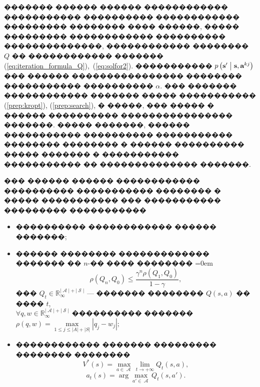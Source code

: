 \documentclass[11pt]{ubs}
\DeclareMathOperator{\state}{\mathcal{S}}
\DeclareMathOperator{\action}{\mathcal{A}}
\begin{document}
������� ������ ������  ������������ ����������� ���������� ������������ ��������� �������� ���� ������, ����� ��������� ������������ ���������� ��������������, ������������ �������� $Q$ �� ������������ ������� (\ref{eq:iteration_formula_Q}),~(\ref{eq:solfor2}). 
�����������  $p\left(\textbf{s}'\bigm| \textbf{s},\textbf{a}^{kj}\right)$ ��� ������ ���������������� �������� ����������� ���������� $\alpha.$ 
��� ������� ������������ ������� ����� ����������� (\ref{prep:kropt}), (\ref{prep:search}), � �����, ��� ����� � ������ ���������� ���������������� �������.
����� �������, ������ ����������� ���������� ����������� �������� �������� � ������ ���������� ����� ������� �  ����������� ����������� �� �������������� �������.

\begin{proposition}\label{prep:search}
  \cite{My3} ��� ������ ������ ������������ ���������� ����������� �������� � ����� ����������� ���
  ����������� ���������  �����������
  \begin{itemize}[itemsep=-3pt]
    \item ���������� ������������ ������ �������;
    \item ������ �������� �������������  ������� �� $n$-�� ���� ��������
          {
          \belowdisplayskip=0em
          $$
            \rho(Q_n, Q_0) \leqslant \frac{\gamma ^n \rho(Q_1, Q_0)}{ 1 - \gamma},
          $$}
          ��� $Q_t \in \mathbb{R} _{\infty}^{| \action|+| \state|}$ --- ������� �������� $Q(s, a)$ �� ���� $t$,\\
          $\forall q,w \in \mathbb{R} _{\infty}^{| \action|+| \state|}$ ���������� �������
          $\rho(q, w) = \max\limits_{ 1\leqslant j \leqslant \left|A\right|+\left|S\right|} \left| {q}_j - {w}_j\right|;$ %
    \item ������������ ������� ��������� �������� ��������
          \begin{equation}\label{Voptsolve}
            V ^*(s) = \max_{a\in  \action}  \lim _{t \to + \infty}Q_t(s, a),     \end{equation}
          \begin{equation}\label{argoptsolve}
            a_t(s) = \arg  \max_{a' \in  \action} Q_t(s, a').  \end{equation}




\end{itemize}
\end{proposition}
\end{document}
